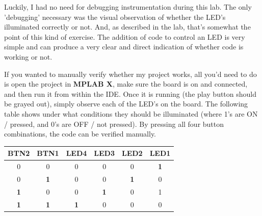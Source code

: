 \documentclass[a4paper, 12pt]{article}
\begin{document}
Luckily, I had no need for debugging instrumentation during this lab. The only 'debugging' necessary was the visual observation of whether the LED's illuminated correctly or not. And, as described in the lab, that's somewhat the point of this kind of exercise. The addition of code to control an LED is very simple and can produce a very clear and direct indication of whether code is working or not.

If you wanted to manually verify whether my project works, all you'd need to do is open the project in \textbf{MPLAB X}, make sure the board is on and connected, and then run it from within the IDE. Once it is running (the play button should be grayed out), simply observe each of the LED's on the board. The following table shows under what conditions they should be illuminated (where 1's are ON / pressed, and 0's are OFF / not pressed). By pressing all four button combinations, the code can be verified manually.
\newpage

\begin{table}
\centering
\begin{tabular}{c|c|c|c|c|c}
\textbf{BTN2} & \textbf{BTN1} & \textbf{LED4} & \textbf{LED3} & \textbf{LED2} & \textbf{LED1} \\
\hline
0 & 0 & 0 & 0 & 0 & \textbf{1} \\
0 & \textbf{1} & 0 & 0 & \textbf{1} & 0 \\
\textbf{1} & 0 & 0 & \textbf{1} & 0 & 1 \\
\textbf{1} & \textbf{1} & \textbf{1} & 0 & 0 & 0 \\
\end{tabular}
\end{table}
\end{document}
